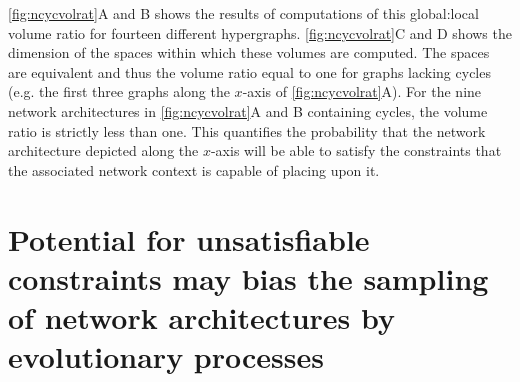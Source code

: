 \ref{fig:ncycvolrat}A and B shows the results of computations of this global:local volume ratio for fourteen different hypergraphs. \ref{fig:ncycvolrat}C and D shows the dimension of the spaces within which these volumes are computed. The spaces are equivalent and thus the volume ratio equal to one for graphs lacking cycles (e.g. the first three graphs along the $x$-axis of \ref{fig:ncycvolrat}A). For the nine network architectures in \ref{fig:ncycvolrat}A and B containing cycles, the volume ratio is strictly less than one. This quantifies the probability that the network architecture depicted along the $x$-axis will be able to satisfy the constraints that the associated network context is capable of placing upon it.

\section{Potential for unsatisfiable constraints may bias the sampling of network architectures by evolutionary processes}\label{sec:unsatisfiableconstrevolution}


